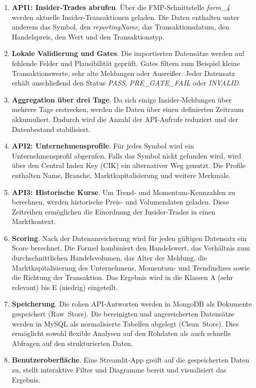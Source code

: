 \begin{enumerate}[label=P\arabic*.,wide=0pt,leftmargin=1.2cm]
  \item \textbf{API1: Insider‑Trades abrufen}. Über die FMP‑Schnittstelle \emph{form\_4} werden aktuelle Insider‑Transaktionen geladen. Die Daten enthalten unter anderem das Symbol, den \emph{reportingName}, das Transaktionsdatum, den Handelspreis, den Wert und den Transaktionstyp.
  \item \textbf{Lokale Validierung und Gates}. Die importierten Datensätze werden auf fehlende Felder und Plausibilität geprüft. Gates filtern zum Beispiel kleine Transaktionswerte, sehr alte Meldungen oder Ausreißer. Jeder Datensatz erhält anschließend den Status \emph{PASS}, \emph{PRE\_GATE\_FAIL} oder \emph{INVALID}.
  \item \textbf{Aggregation über drei Tage}. Da sich einige Insider‑Meldungen über mehrere Tage erstrecken, werden die Daten über einen definierten Zeitraum akkumuliert. Dadurch wird die Anzahl der API‑Aufrufe reduziert und der Datenbestand stabilisiert.
  \item \textbf{API2: Unternehmensprofile}. Für jedes Symbol wird ein Unternehmensprofil abgerufen. Falls das Symbol nicht gefunden wird, wird über den Central Index Key (CIK) ein alternativer Weg genutzt. Die Profile enthalten Name, Branche, Marktkapitalisierung und weitere Merkmale.
  \item \textbf{API3: Historische Kurse}. Um Trend‑ und Momentum‑Kennzahlen zu berechnen, werden historische Preis‑ und Volumendaten geladen. Diese Zeitreihen ermöglichen die Einordnung der Insider‑Trades in einen Marktkontext.
  \item \textbf{Scoring}. Nach der Datenanreicherung wird für jeden gültigen Datensatz ein Score berechnet. Die Formel kombiniert den Handelswert, das Verhältnis zum durchschnittlichen Handelsvolumen, das Alter der Meldung, die Marktkapitalisierung des Unternehmens, Momentum‑ und Trendindizes sowie die Richtung der Transaktion. Das Ergebnis wird in die Klassen A (sehr relevant) bis E (niedrig) eingeteilt.
  \item \textbf{Speicherung}. Die rohen API‑Antworten werden in MongoDB als Dokumente gespeichert (Raw Store). Die bereinigten und angereicherten Datensätze werden in MySQL als normalisierte Tabellen abgelegt (Clean Store). Dies ermöglicht sowohl flexible Analysen auf den Rohdaten als auch schnelle Abfragen auf den strukturierten Daten.
  \item \textbf{Benutzeroberfläche}. Eine Streamlit‑App greift auf die gespeicherten Daten zu, stellt interaktive Filter und Diagramme bereit und visualisiert das Ergebnis.
\end{enumerate}

